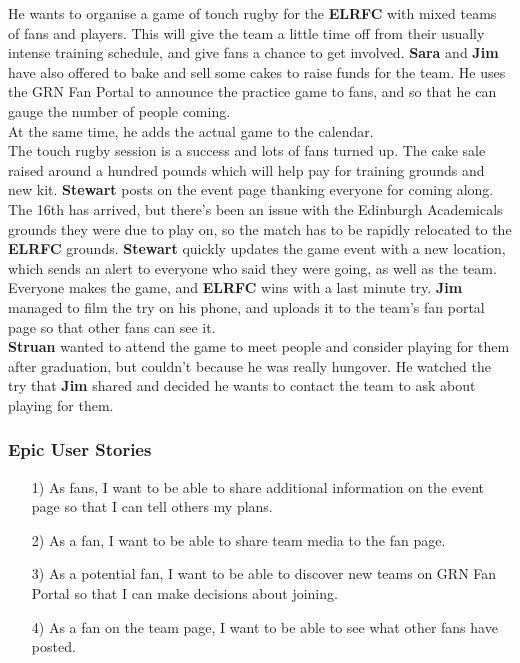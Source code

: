 \documentclass[10pt,a4paper]{article}
\begin{document}
He wants to organise a game of touch rugby for the \textbf{ELRFC} with mixed teams of fans and players. This will give the team a little time off from their usually intense training schedule, and give fans a chance to get involved. \textbf{Sara} and \textbf{Jim} have also offered to bake and sell some cakes to raise funds for the team. He uses the GRN Fan Portal to announce the practice game to fans, and so that he can gauge the number of people coming. \\

At the same time, he adds the actual game to the calendar. \\

The touch rugby session is a success and lots of fans turned up. The cake sale raised around a hundred pounds which will help pay for training grounds and new kit. \textbf{Stewart} posts on the event page thanking everyone for coming along.\\

The 16th has arrived, but there’s been an issue with the Edinburgh Academicals grounds they were due to play on, so the match has to be rapidly relocated to the \textbf{ELRFC} grounds. \textbf{Stewart} quickly updates the game event with a new location, which sends an alert to everyone who said they were going, as well as the team. Everyone makes the game, and \textbf{ELRFC} wins with a last minute try. \textbf{Jim} managed to film the try on his phone, and uploads it to the team’s fan portal page so that other fans can see it. \\

\textbf{Struan}  wanted to attend the game to meet people and consider playing for them after graduation, but couldn’t because he was really hungover. He watched the try that \textbf{Jim} shared and decided he wants to contact the team to ask about playing for them. \\

\subsubsection{Epic User Stories}
\begin{itemize}


\item[1)]
As fans, I want to be able to share additional information on the event page so that I can tell others my plans.
\item[2)]
As a fan, I want to be able to share team media to the fan page.
\item[3)]
As a potential fan, I want to be able to discover new teams on GRN Fan Portal so that I can make decisions about joining.
\item[4)]
As a fan on the team page, I want to be able to see what other fans have posted.


\end{itemize}
\end{document}
